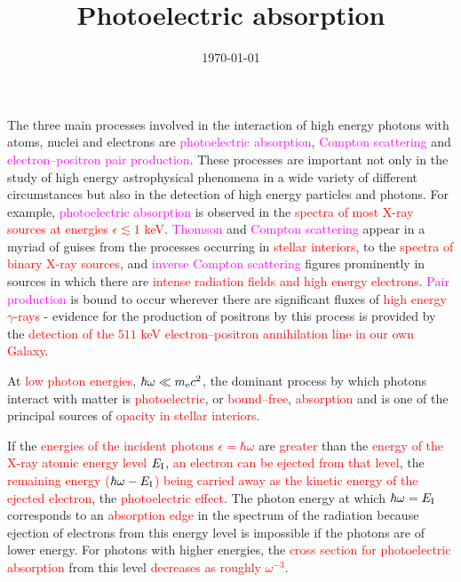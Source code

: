 \documentclass[12pt,a4paper]{article}
\title{Photoelectric absorption}
\author{}
\date{\today}
\begin{document}
\maketitle

The three main processes involved in the interaction of high energy photons with atoms, nuclei and electrons are \textcolor{magenta}{photoelectric absorption}, \textcolor{magenta}{Compton scattering} and \textcolor{magenta}{electron–positron pair production}. These processes are important not only in the study of high energy astrophysical phenomena in a wide variety of different circumstances but also in the detection of high energy particles and photons. For example, \textcolor{magenta}{photoelectric absorption} is observed in the \textcolor{red}{spectra of most X-ray sources at energies $\epsilon \lesssim 1$ keV}. \textcolor{magenta}{Thomson} and \textcolor{magenta}{Compton scattering} appear in a myriad of guises from the processes occurring in \textcolor{red}{stellar interiors}, to the \textcolor{red}{spectra of binary X-ray sources}, and \textcolor{magenta}{inverse Compton scattering} figures prominently in sources in which there are \textcolor{red}{intense radiation fields and high energy electrons}. \textcolor{magenta}{Pair production} is bound to occur wherever there are significant fluxes of \textcolor{red}{high energy $\gamma$-rays} - evidence for the production of positrons by this process is provided by the \textcolor{red}{detection of the $511$ keV electron–positron annihilation line in our own Galaxy}.


At \textcolor{red}{low photon energies}, \textcolor{red}{$\hbar\omega \ll m_{\rm e}c^2$}, the dominant process by which photons interact with matter is \textcolor{red}{photoelectric}, or \textcolor{red}{bound–free}, \textcolor{red}{absorption} and is one of the principal sources of \textcolor{red}{opacity in stellar interiors}.

If the \textcolor{red}{energies of the incident photons $\epsilon = \hbar\omega$} are \textcolor{red}{greater} than the \textcolor{red}{energy of the X-ray atomic energy level $E_{\rm I}$}, \textcolor{red}{an electron can be ejected from that level}, the \textcolor{red}{remaining energy ($\hbar\omega - E_{\rm I}$) being carried away as the kinetic energy of the ejected electron}, the \textcolor{red}{photoelectric effect}. The photon energy at which $\hbar\omega = E_{\rm I}$ corresponds to an \textcolor{red}{absorption edge} in the spectrum of the radiation because ejection of electrons from this energy level is impossible if the photons are of lower energy. For photons with higher energies, the \textcolor{red}{cross section for photoelectric absorption} from this level \textcolor{red}{decreases as roughly $\omega^{-3}$}.
\end{document}
